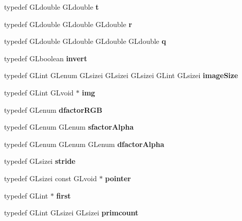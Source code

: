 \begin{DoxyCompactItemize}
\item 
typedef G\+Ldouble G\+Ldouble {\bfseries t}\label{_s_d_l__opengl_8h_a00140d6f5c548b26daf170bf16e86a6d}

\item 
typedef G\+Ldouble G\+Ldouble G\+Ldouble {\bfseries r}\label{_s_d_l__opengl_8h_a31034e24af8271ed8267858116fe2e48}

\item 
typedef G\+Ldouble G\+Ldouble G\+Ldouble G\+Ldouble {\bfseries q}\label{_s_d_l__opengl_8h_afb30bc844faa48275d1c84294956a44b}

\item 
typedef G\+Lboolean {\bfseries invert}\label{_s_d_l__opengl_8h_afcc4054e54dc14717dc9df064f152b6b}

\item 
typedef G\+Lint G\+Lenum G\+Lsizei G\+Lsizei G\+Lsizei G\+Lint G\+Lsizei {\bfseries image\+Size}\label{_s_d_l__opengl_8h_a2f5934b61dbd601db8002b6a7bd2d13f}

\item 
typedef G\+Lint G\+Lvoid $\ast$ {\bfseries img}\label{_s_d_l__opengl_8h_a92ca64eaed2bef2c93999260bc6cf98e}

\item 
typedef G\+Lenum {\bfseries dfactor\+R\+G\+B}\label{_s_d_l__opengl_8h_ace6fa1d73128e6b24233f54f0beac9cc}

\item 
typedef G\+Lenum G\+Lenum {\bfseries sfactor\+Alpha}\label{_s_d_l__opengl_8h_a147716336d55f4ee3ec628f7bec7a6b1}

\item 
typedef G\+Lenum G\+Lenum G\+Lenum {\bfseries dfactor\+Alpha}\label{_s_d_l__opengl_8h_a0529a4b173595ca2f8b5a42830266f10}

\item 
typedef G\+Lsizei {\bfseries stride}\label{_s_d_l__opengl_8h_adec60f1216ca1b900f8d776c5b6190e0}

\item 
typedef G\+Lsizei const G\+Lvoid $\ast$ {\bfseries pointer}\label{_s_d_l__opengl_8h_a809f16da56d1ff9e4ef4716f6aacaa91}

\item 
typedef G\+Lint $\ast$ {\bfseries first}\label{_s_d_l__opengl_8h_a970a385f6f880f2b620451db4ca4299a}

\item 
typedef G\+Lint G\+Lsizei G\+Lsizei {\bfseries primcount}\label{_s_d_l__opengl_8h_a286b5433e86a000955c14601a223e6d4}


\end{DoxyCompactItemize}
